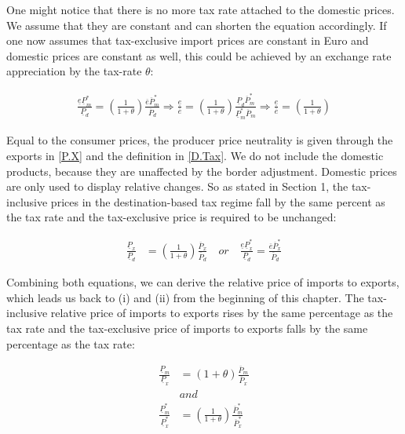 One might notice that there is no more tax rate attached to the domestic prices. We assume that they are constant and can shorten the equation accordingly. If one now assumes that tax-exclusive import prices are constant in Euro and domestic prices are constant as well, this could be achieved by an exchange rate appreciation by the tax-rate $\theta$:

\begin{equation}
\begin{aligned}
\frac{\underline e \underline P_m^*}{\underline P_d} =\left( \frac{1}{1+\theta} \right) \frac{\overline e \overline P^*_m}{\overline P_d} \Rightarrow \frac{\underline e}{\overline e} = \left( \frac{1}{1+\theta} \right) \frac{\underline P_d\overline P^*_m}{\underline P_m^*\overline P_m} \Rightarrow \frac{\underline e}{\overline e} = \left( \frac{1}{1+\theta} \right) \nonumber
\end{aligned}
\end{equation}

Equal to the consumer prices, the producer price neutrality is given through the exports in \eqref{P.X} and the definition in \eqref{D.Tax}. We do not include the domestic products, because they are unaffected by the border adjustment. Domestic prices are only used to display relative changes. So as stated in Section 1, the tax-inclusive prices in the destination-based tax regime fall by the same percent as the tax rate and the tax-exclusive price is required to be unchanged:

\begin{equation}\label{xtod}
\begin{aligned}
\frac{\underline P_x}{\underline P_d} &=  \left( \frac{1}{1+\theta} \right) \frac{\overline P_x}{\overline P_d} \quad or \quad \frac{\underline e \underline P_x^*}{\underline P_d} = \frac{\overline e \overline P^*_x}{\overline P_d} 
\end{aligned}
\end{equation}

Combining both equations, we can derive the relative price of imports to exports, which leads us back to (i) and (ii) from the beginning of this chapter. 
The tax-inclusive relative price of imports to exports rises by the same percentage as the tax rate and the tax-exclusive price of imports to exports falls by the same percentage as the tax rate: 

\begin{align}
    \frac{\underline P_m}{\underline P_x} &= (1+\theta)\frac{\overline P_m}{\overline P_x} \label{mtox.1} \\
    &and \nonumber \\
    \frac{\underline P_m^*}{\underline P_x^*} &= \left(\frac{1}{1+\theta}\right)\frac{\overline P_m^*}{\overline P_x^*} \label{mtox.2}
\end{align}

